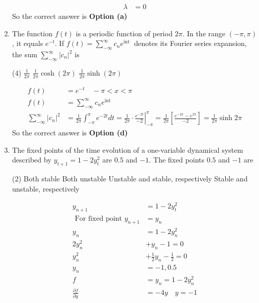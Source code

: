 \begin{enumerate}
\begin{answer}
\begin{align*}
	\lambda&=0
	\end{align*}
		So the correct answer is \textbf{Option (a)}
\end{answer}
\item The function $f(t)$ is a periodic function of period $2 \pi$. In the range $(-\pi, \pi)$, it equals $e^{-t}$. If $f(t)=\sum_{-\infty}^{\infty} c_{n} e^{\text {int }}$ denotes its Fourier series expansion, the sum $\sum_{-\infty}^{\infty}\left|c_{n}\right|^{2}$ is
 \begin{tasks}(4)
	\task[\textbf{b.}]$\frac{1}{2 \pi}$
	\task[\textbf{c.}] $\frac{1}{2 \pi} \cosh (2 \pi)$
	\task[\textbf{d.}] $\frac{1}{2 \pi} \sinh (2 \pi)$
\end{tasks}
\begin{answer}
	\begin{align*}
	f(t)&=e^{-t} \quad-\pi<x<\pi\\
	f(t)&=\sum_{-\infty}^{\infty} c_{n} e^{\mathrm{int}} \\
	\sum_{-\infty}^{\infty}\left|c_{n}\right|^{2}&=\frac{1}{2 \pi} \int_{-\pi}^{\pi} e^{-2 t} d t=\left.\frac{1}{2 \pi} \cdot \frac{e^{-2 t}}{-2}\right|_{-\pi} ^{\pi}=\frac{1}{2 \pi}\left[\frac{e^{-2 \pi}-e^{2 \pi}}{-2}\right]=\frac{1}{2 \pi} \sinh 2 \pi
	\end{align*}
		So the correct answer is \textbf{Option (d)}
\end{answer}
\item The fixed points of the time evolution of a one-variable dynamical system described by $y_{t+1}=1-2 y_{t}^{2}$ are $0.5$ and $-1$. The fixed points $0.5$ and $-1$ are
 \begin{tasks}(2)
	\task[\textbf{a.}]Both stable
	\task[\textbf{b.}] Both unstable
	\task[\textbf{c.}] Unstable and stable, respectively
	\task[\textbf{d.}] Stable and unstable, respectively
\end{tasks}
\begin{answer}
	\begin{align*}
	y_{n+1}&=1-2 y_{t}^{2}\\
	\text { For fixed point } y_{n+1}&=y_{n}\\
	y_{n}&=1-2 y_{n}^{2} \\
	2 y_{n}^{2}&+y_{n}-1=0 \\
	y_{n}^{2}&+\frac{1}{2} y_{n}-\frac{1}{2}=0 \\
	y_{n}&=-1,0.5 \\
	f&=y_{n}=1-2 y_{n}^{2}\\
	\frac{\partial f}{\partial y}&=-4 y \quad y=-1 \\

\end{align*}
\end{answer}
\end{enumerate}
